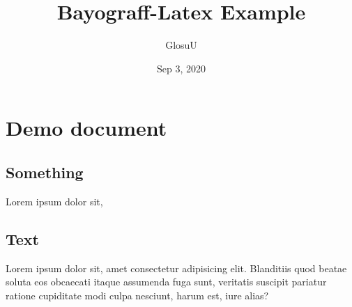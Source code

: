 \documentclass[12pt, a4paper]{article}
\author{GlosuU}
\title{Bayograff-Latex Example}
\date{Sep 3, 2020}
\begin{document}
\maketitle
\tableofcontents
\section{Demo document}

\subsection{Something}
Lorem ipsum dolor sit,

\subsection{Text}
Lorem ipsum dolor sit, amet consectetur adipisicing elit. Blanditiis quod beatae soluta eos obcaecati itaque assumenda fuga sunt, veritatis suscipit pariatur ratione cupiditate modi culpa nesciunt, harum est, iure alias?
\end{document}
